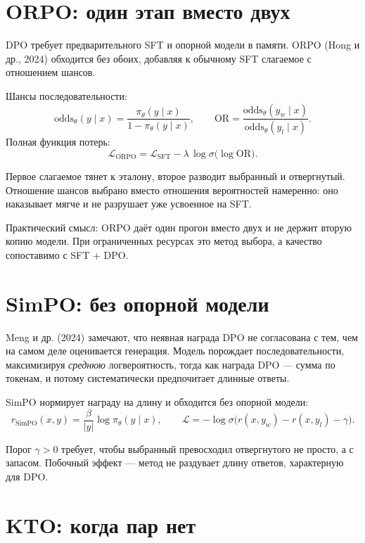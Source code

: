 \documentclass[11pt,a4paper]{article}
\begin{document}
\section{ORPO: один этап вместо двух}

DPO требует предварительного SFT и опорной модели в памяти. ORPO
(Hong и др., 2024) обходится без обоих, добавляя к обычному SFT
слагаемое с отношением шансов.

Шансы последовательности:
\[
\text{odds}_\theta(y\mid x) = \frac{\pi_\theta(y\mid x)}{1-\pi_\theta(y\mid x)},
\qquad
\text{OR} = \frac{\text{odds}_\theta(y_w\mid x)}{\text{odds}_\theta(y_l\mid x)} .
\]
Полная функция потерь:
\[
\mathcal{L}_{\text{ORPO}} = \mathcal{L}_{\text{SFT}}
- \lambda\,\log\sigma\big(\log \text{OR}\big).
\]

Первое слагаемое тянет к эталону, второе разводит выбранный
и отвергнутый. Отношение шансов выбрано вместо отношения вероятностей
намеренно: оно наказывает мягче и не разрушает уже усвоенное на SFT.

\begin{keybox}
Практический смысл: ORPO даёт один прогон вместо двух и не держит
вторую копию модели. При ограниченных ресурсах это метод выбора,
а качество сопоставимо с SFT + DPO.
\end{keybox}

\section{SimPO: без опорной модели}

Meng и др. (2024) замечают, что неявная награда DPO не согласована
с тем, чем на самом деле оценивается генерация. Модель порождает
последовательности, максимизируя \emph{среднюю} логвероятность, тогда
как награда DPO — сумма по токенам, и потому систематически предпочитает
длинные ответы.

SimPO нормирует награду на длину и обходится без опорной модели:
\[
r_{\text{SimPO}}(x,y) = \frac{\beta}{|y|}\log\pi_\theta(y\mid x),
\qquad
\mathcal{L} = -\log\sigma\big(r(x,y_w) - r(x,y_l) - \gamma\big).
\]

Порог $\gamma > 0$ требует, чтобы выбранный превосходил отвергнутого
не просто, а с запасом. Побочный эффект — метод не раздувает длину
ответов, характерную для DPO.

\section{KTO: когда пар нет}
\end{document}
